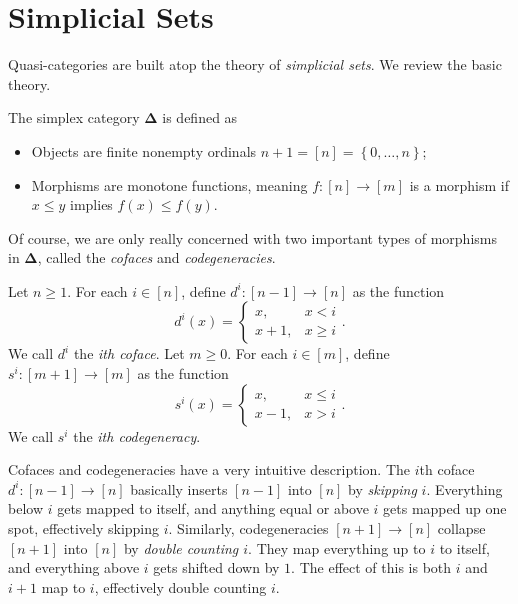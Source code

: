 \section{Simplicial Sets}
Quasi-categories are built atop the theory of \emph{simplicial sets}. We review the basic theory.

\begin{definition}\label{3.1}
	The simplex category $\boldsymbol{\Delta} $ is defined as
	\begin{itemize}
		\item Objects are finite nonempty ordinals $n+1=[n]=\left\{ 0, \ldots ,n \right\} $;
		\item Morphisms are monotone functions, meaning $f : [n] \to [m]$ is a morphism if $x\leq y$ implies $f(x)\leq f(y)$.
	\end{itemize}
\end{definition}

Of course, we are only really concerned with two important types of morphisms in $\boldsymbol{\Delta} $, called the \emph{cofaces} and \emph{codegeneracies}.

\begin{definition}\label{3.2}
	Let $n\geq 1$. For each $i\in[n]$, define $d^i : [n-1] \to [n]$ as the function
	\[
		d^i(x)=\begin{cases}
			x,&x< i\\
			x+1,&x\geq i
		\end{cases}
	.\]
	We call $d^i$ the \emph{ith coface}. Let $m\geq 0$. For each $i\in[m]$, define $s^i : [m+1] \to [m]$ as the function
	\[
		s^i(x)=
		\begin{cases}
			x,&x\leq i\\
			x-1,&x>i
		\end{cases}
	.\]
	We call $s^i$ the \emph{ith codegeneracy}.
\end{definition}

\begin{intuition}\label{3.3}
	Cofaces and codegeneracies have a very intuitive description. The $i$th coface $d^i : [n-1] \to [n]$ basically inserts $[n-1]$ into $[n]$ by \emph{skipping} $i$. Everything below $i$ gets mapped to itself, and anything equal or above $i$ gets mapped up one spot, effectively skipping $i$. Similarly, codegeneracies $[n+1]\to [n]$ collapse $[n+1]$ into $[n]$ by \emph{double counting $i$}. They map everything up to $i$ to itself, and everything above $i$ gets shifted down by $1$. The effect of this is both $i$ and $i+1$ map to $i$, effectively double counting $i$.
\end{intuition}

